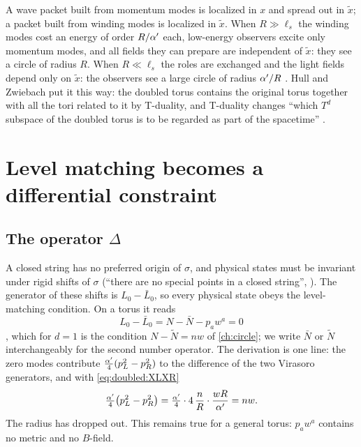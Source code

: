 \begin{physicsbox}
A wave packet built from momentum modes is localized in $x$ and spread out in $\tilde x$; a
packet built from winding modes is localized in $\tilde x$. When $R\gg\ell_s$ the winding
modes cost an energy of order $R/\alpha'$ each, low-energy observers excite only momentum modes,
and all fields they can prepare are independent of $\tilde x$: they see a circle of radius
$R$. When $R\ll\ell_s$ the roles are exchanged and the light fields depend only on $\tilde x$:
the observers see a large circle of radius $\alpha'/R$ .
Hull and Zwiebach put it this way: the doubled torus contains the original torus together with
all the tori related to it by T-duality, and T-duality changes ``which $T^d$ subspace of the
doubled torus is to be regarded as part of the spacetime'' .
\end{physicsbox}

\section{Level matching becomes a differential constraint}\label{sec:doubled:weak}

\subsection{The operator \texorpdfstring{$\Delta$}{Delta}}

A closed string has no preferred origin of $\sigma$, and physical states must be invariant
under rigid shifts of $\sigma$ (``there are no special points in a closed string'',
). The generator of these shifts is $L_0-\bar L_0$, so
every physical state obeys the level-matching condition. On a torus it reads
\begin{equation}\label{eq:doubled:LM}
L_0-\bar L_0=N-\bar N-p_aw^a=0
\end{equation}
, which for $d=1$ is the condition $N-\tilde N=nw$ of
\cref{ch:circle}; we write $\bar N$ or $\tilde N$ interchangeably for the second number
operator. The derivation is one line: the zero modes contribute
$\frac{\alpha'}{4}(p_L^2-p_R^2)$ to the difference of the two Virasoro generators, and with
\eqref{eq:doubled:XLXR}
\[
\tfrac{\alpha'}{4}\bigl(p_L^2-p_R^2\bigr)=\tfrac{\alpha'}{4}\cdot4\,\frac nR\cdot\frac{wR}{\alpha'}=nw .
\]
The radius has dropped out. This remains true for a general torus: $p_aw^a$ contains no metric
and no $B$-field.

